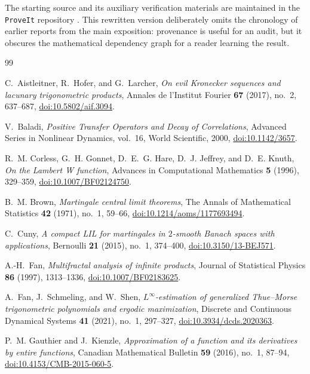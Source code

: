 \documentclass[11pt,oneside]{article}
\numberwithin{equation}{section}
\theoremstyle{definition}
\theoremstyle{remark}
\begin{document}
The starting source and its auxiliary verification materials are maintained in the
\texttt{ProveIt} repository \cite{proveit}.  This rewritten version deliberately omits the
chronology of earlier reports from the main exposition: provenance is useful for an audit,
but it obscures the mathematical dependency graph for a reader learning the result.

\begin{thebibliography}{99}

C.~Aistleitner, R.~Hofer, and G.~Larcher,
\emph{On evil Kronecker sequences and lacunary trigonometric products},
Annales de l'Institut Fourier \textbf{67} (2017), no.~2, 637--687,
\href{https://doi.org/10.5802/aif.3094}{doi:10.5802/aif.3094}.

V.~Baladi,
\emph{Positive Transfer Operators and Decay of Correlations},
Advanced Series in Nonlinear Dynamics, vol.~16, World Scientific, 2000,
\href{https://doi.org/10.1142/3657}{doi:10.1142/3657}.

R.~M. Corless, G.~H. Gonnet, D.~E.~G. Hare, D.~J. Jeffrey, and D.~E. Knuth,
\emph{On the Lambert W function},
Advances in Computational Mathematics \textbf{5} (1996), 329--359,
\href{https://doi.org/10.1007/BF02124750}{doi:10.1007/BF02124750}.

B.~M. Brown,
\emph{Martingale central limit theorems},
The Annals of Mathematical Statistics \textbf{42} (1971), no.~1, 59--66,
\href{https://doi.org/10.1214/aoms/1177693494}{doi:10.1214/aoms/1177693494}.

C.~Cuny,
\emph{A compact LIL for martingales in \(2\)-smooth Banach spaces with applications},
Bernoulli \textbf{21} (2015), no.~1, 374--400,
\href{https://doi.org/10.3150/13-BEJ571}{doi:10.3150/13-BEJ571}.

A.-H.~Fan,
\emph{Multifractal analysis of infinite products},
Journal of Statistical Physics \textbf{86} (1997), 1313--1336,
\href{https://doi.org/10.1007/BF02183625}{doi:10.1007/BF02183625}.

A.~Fan, J.~Schmeling, and W.~Shen,
\emph{\(L^\infty\)-estimation of generalized Thue--Morse trigonometric polynomials and
ergodic maximization},
Discrete and Continuous Dynamical Systems \textbf{41} (2021), no.~1, 297--327,
\href{https://doi.org/10.3934/dcds.2020363}{doi:10.3934/dcds.2020363}.

P.~M. Gauthier and J.~Kienzle,
\emph{Approximation of a function and its derivatives by entire functions},
Canadian Mathematical Bulletin \textbf{59} (2016), no.~1, 87--94,
\href{https://doi.org/10.4153/CMB-2015-060-5}{doi:10.4153/CMB-2015-060-5}.


\end{thebibliography}
\end{document}
